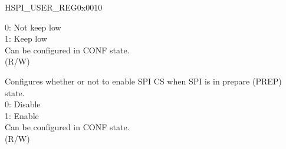 \begin{register}{H}{SPI\_USER\_REG}{0x0010}
\begin{regdesc}
\begin{reglist}
0: Not keep low \\
1: Keep low \\
Can be configured in CONF state. \\ (R/W)
\label{fielddesc:SPICSSETUP}\item [SPI\_CS\_SETUP] Configures whether or not to enable SPI CS when SPI is in prepare (PREP) state. \\
0: Disable \\
1: Enable \\
Can be configured in CONF state.\\ (R/W)
\item [Continued on the next page...]
\end{reglist}\end{regdesc}
\end{register}


